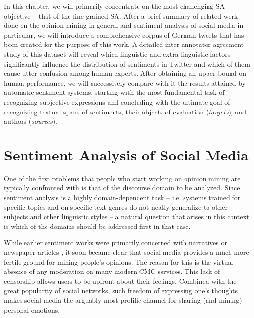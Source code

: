 In this chapter, we will primarily concentrate on the most challenging
SA objective -- that of the fine-grained SA.  After a brief summary of
related work done on the opinion mining in general and sentiment
analysis of social media in particular, we will introduce a
comprehensive corpus of German tweets that has been created for the
purpose of this work.  A detailed inter-annotator agreement study of
this dataset will reveal which linguistic and extra-linguistic factors
significantly influence the distribution of sentiments in Twitter and
which of them cause utter confusion among human experts.  After
obtaining an upper bound on human performance, we will successively
compare with it the results attained by automatic sentiment systems,
starting with the most fundamental task of recognizing subjective
expressions and concluding with the ultimate goal of recognizing
textual spans of sentiments, their objects of evaluation
(\emph{targets}), and authors (\emph{sources}).


\section{Sentiment Analysis of Social Media}

One of the first problems that people who start working on opinion
mining are typically confronted with is that of the discourse domain
to be analyzed.  Since sentiment analysis is a highly domain-dependent
task \citep[cf.][]{Aue:05,Blitzer:07,Li:08,Jakob:10} -- i.e. systems
trained for specific topics and on specific text genres do not neatly
generalize to other subjects and other linguistic styles -- a natural
question that arises in this context is which of the domains should be
addressed first in that case.

While earlier sentiment works were primarily concerned with narratives
\citep{Wiebe:90a,Wiebe:94} or newspaper articles
\citep{Wiebe:03,Wiebe:05,Bautin:08}, it soon became clear that social
media provides a much more fertile ground for mining people's
opinions.  The reason for this is the virtual absence of any
moderation on many modern CMC services.  This lack of censorship
allows users to be upfront about their feelings.  Combined with the
great popularity of social networks, such freedom of expressing one's
thoughts makes social media the arguably most prolific channel for
sharing (and mining) personal emotions.

